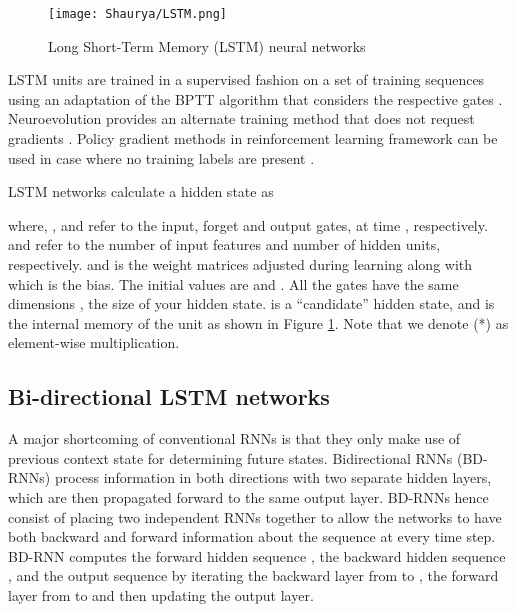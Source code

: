 \documentclass[final,5p,times,twocolumn]{elsarticle}
\begin{document}
\begin{figure}[htbp!]
  \begin{center}  
   \texttt{[image: Shaurya/LSTM.png]} 
    \caption{ Long Short-Term Memory (LSTM)  neural networks 
}
 \label{fig:LSTM}
  \end{center}
\end{figure}

 
 
 
   LSTM units are trained in a supervised fashion on a set of training sequences  using an adaptation of the BPTT algorithm that considers the respective gates \cite{hochreiter1997long}.   Neuroevolution provides an alternate training method that does not request gradients \cite{rawal2016evolving}. Policy gradient methods in reinforcement learning framework can be used in case where no training labels are present \cite{bakker2002reinforcement}.
  
  
  LSTM networks calculate a hidden state   as
 

 where,  ,  and  refer to the input, forget and output gates, at time , respectively.   and   refer to the number of input features and number of hidden units, respectively.    and  is the weight matrices adjusted during learning along with   which is the bias.   The initial values are  and   . All the gates have the same dimensions , the size of your hidden state.  is a “candidate” hidden state, and   is the internal memory of the unit as shown in Figure \ref{fig:LSTM}.  Note that we  denote (*) as element-wise multiplication.


 
 
 
  \subsection{Bi-directional LSTM networks }
  
  
A major shortcoming of conventional RNNs is that they 
only  make use of previous context state for determining future states. Bidirectional
RNNs (BD-RNNs) \cite{schuster1997}  process information in both
directions with two separate hidden layers, which are then
propagated forward to the same output layer. 
BD-RNNs hence consist of  placing two independent RNNs together to allow the networks to have both backward and forward information about the sequence at every time step. BD-RNN computes the forward hidden sequence , the backward hidden sequence , and the output sequence  by iterating the backward layer from  to , the forward layer from  to  
and then updating the output layer.  
\end{document}

